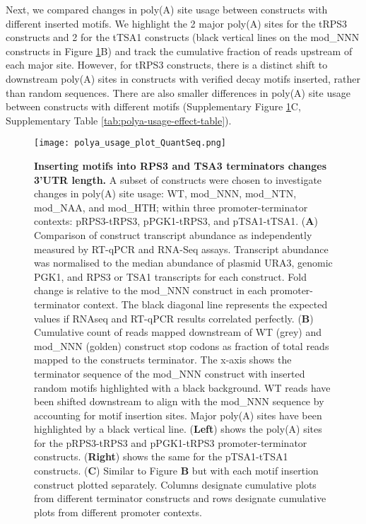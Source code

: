 \documentclass[../main.tex]{subfiles}
\begin{document}
Next, we compared changes in poly(A) site usage between constructs with different inserted motifs.
We highlight the 2 major poly(A) sites for the tRPS3 constructs and 2 for the tTSA1 constructs (black vertical lines on the mod\_NNN constructs in Figure \ref{fig:quantseq-polyA-site-usage}B) and track the cumulative fraction of reads upstream of each major site.
However, for tRPS3 constructs, there is a distinct shift to downstream poly(A) sites in constructs with verified decay motifs inserted, rather than random sequences.
There are also smaller differences in poly(A) site usage between constructs with different motifs (Supplementary Figure \ref{fig:quantseq-polyA-site-usage}C, Supplementary Table \ref{tab:polya-usage-effect-table}).

\begin{figure}[p]

{\centering \texttt{[image: polya\_usage\_plot\_QuantSeq.png]} 

}

\caption[Inserting motifs into RPS3 and TSA3 terminators changes 3'UTR length.]{\textbf{Inserting motifs into RPS3 and TSA3 terminators changes 3'UTR length.} A subset of constructs were chosen to investigate changes in poly(A) site usage: WT, mod\_NNN, mod\_NTN, mod\_NAA, and mod\_HTH; within three promoter-terminator contexts: pRPS3-tRPS3, pPGK1-tRPS3, and pTSA1-tTSA1. (\textbf{A}) Comparison of construct transcript abundance as independently measured by  RT-qPCR and RNA-Seq assays. Transcript abundance was normalised to the median abundance of  plasmid URA3, genomic PGK1, and RPS3 or TSA1 transcripts for each construct. Fold change is relative to the mod\_NNN construct in each promoter-terminator context. The black diagonal line represents the expected values if RNAseq and  RT-qPCR results correlated perfectly. (\textbf{B}) Cumulative count of reads mapped downstream of WT (grey) and mod\_NNN (golden) construct stop codons as fraction of total reads mapped to the constructs terminator. The x-axis shows the terminator sequence of the mod\_NNN construct with inserted random motifs highlighted with a black background. WT reads have been shifted downstream to align with the mod\_NNN sequence by accounting for motif insertion sites. Major poly(A) sites have been highlighted by a black vertical line. (\textbf{Left}) shows the poly(A) sites for the pRPS3-tRPS3 and pPGK1-tRPS3 promoter-terminator constructs. (\textbf{Right}) shows the same for the pTSA1-tTSA1 constructs. (\textbf{C}) Similar to Figure \textbf{B} but with each motif insertion construct plotted separately. Columns designate cumulative plots from different terminator constructs and rows designate cumulative plots from different promoter contexts.}\label{fig:quantseq-polyA-site-usage}
\end{figure}
\end{document}
